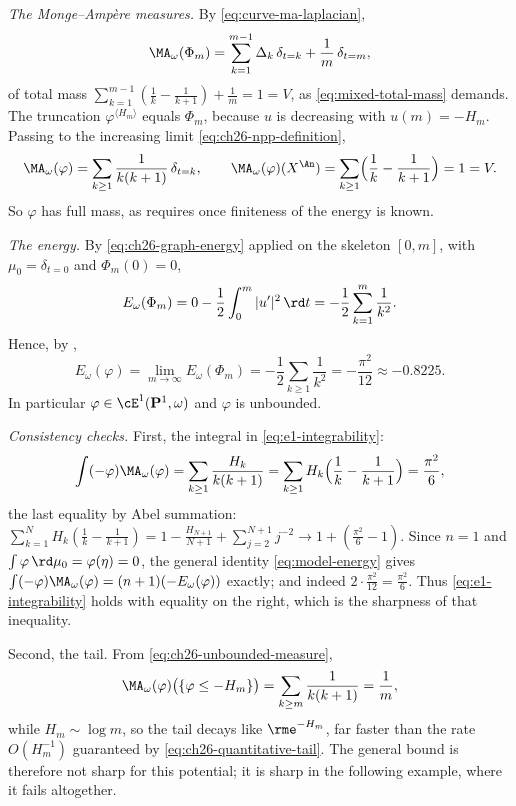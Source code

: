 \begin{example}
\emph{The Monge--Amp\`ere measures.}  By
\eqref{eq:curve-ma-laplacian},
\[
 \MA_\omega(\Phi_m)
 =\sum_{k=1}^{m-1}\Delta_k\,\delta_{t=k}+\frac1m\,\delta_{t=m},
\]
of total mass \(\sum_{k=1}^{m-1}(\tfrac1k-\tfrac1{k+1})+\tfrac1m=1=V\), as
\eqref{eq:mixed-total-mass} demands.  The truncation
\(\varphi^{\langle H_m\rangle}\) equals \(\Phi_m\), because \(u\) is
decreasing with \(u(m)=-H_m\).  Passing to the increasing limit
\eqref{eq:ch26-npp-definition},
\begin{equation}
\label{eq:ch26-unbounded-measure}
 \MA_\omega(\varphi)=\sum_{k\geq1}\frac{1}{k(k+1)}\,\delta_{t=k},
 \qquad
 \MA_\omega(\varphi)(X^{\An})=\sum_{k\geq1}
   \Bigl(\frac1k-\frac1{k+1}\Bigr)=1=V .
\end{equation}
So \(\varphi\) has full mass, as  requires
once finiteness of the energy is known.

\emph{The energy.}  By \eqref{eq:ch26-graph-energy} applied on the skeleton
\([0,m]\), with \(\mu_0=\delta_{t=0}\) and \(\Phi_m(0)=0\),
\[
 E_\omega(\Phi_m)
 =0-\frac12\int_0^m|u'|^2\,\rd t
 =-\frac12\sum_{k=1}^m\frac1{k^2}.
\]
Hence, by ,
\begin{equation}
\label{eq:ch26-unbounded-energy}
 E_\omega(\varphi)=\lim_{m\to\infty}E_\omega(\Phi_m)
 =-\frac12\sum_{k\geq1}\frac1{k^2}
 =-\frac{\pi^2}{12}\approx-0.8225 .
\end{equation}
In particular \(\varphi\in\cE^1(\mathbf P^1,\omega)\) and \(\varphi\) is
unbounded.

\emph{Consistency checks.}  First, the integral in
\eqref{eq:e1-integrability}:
\[
 \int(-\varphi)\MA_\omega(\varphi)
 =\sum_{k\geq1}\frac{H_k}{k(k+1)}
 =\sum_{k\geq1}H_k\Bigl(\frac1k-\frac1{k+1}\Bigr)
 =\frac{\pi^2}{6},
\]
the last equality by Abel summation:
\(\sum_{k=1}^NH_k(\tfrac1k-\tfrac1{k+1})
=1-\tfrac{H_{N+1}}{N+1}+\sum_{j=2}^{N+1}j^{-2}\to1+(\tfrac{\pi^2}{6}-1)\).
Since \(n=1\) and \(\int\varphi\,\rd\mu_0=\varphi(\eta)=0\), the general
identity \eqref{eq:model-energy} gives
\(\int(-\varphi)\MA_\omega(\varphi)=(n+1)(-E_\omega(\varphi))\) exactly; and
indeed \(2\cdot\tfrac{\pi^2}{12}=\tfrac{\pi^2}{6}\).  Thus
\eqref{eq:e1-integrability} holds with equality on the right, which is the
sharpness of that inequality.

Second, the tail.  From \eqref{eq:ch26-unbounded-measure},
\[
 \MA_\omega(\varphi)\bigl(\{\varphi\leq-H_m\}\bigr)
 =\sum_{k\geq m}\frac1{k(k+1)}=\frac1m,
\]
while \(H_m\sim\log m\), so the tail decays like \(\rme^{-H_m}\), far faster
than the rate \(O(H_m^{-1})\) guaranteed by
\eqref{eq:ch26-quantitative-tail}.  The general bound is therefore not sharp
for this potential; it is sharp in the following example, where it fails
altogether.
\end{example}

